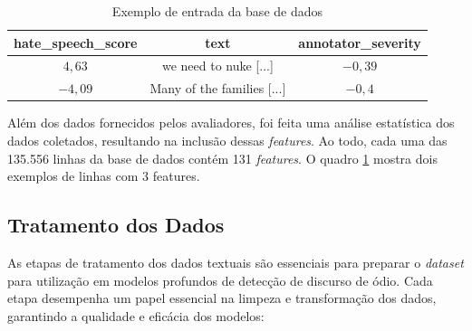 \documentclass[conference]{IEEEtran}
\begin{document}
\begin{table}[]
    \centering
    \caption{Exemplo de entrada da base de dados \cite{kennedy2020constructing}}
    \label{tab:dataset_example}
    \begin{tabular}{|c|c|c|}
        \hline
        \textbf{hate\_speech\_score} & \textbf{text} & \textbf{annotator\_severity} \\
        \hline
        $4,63$ & we need to nuke [...] & $-0,39$ \\\hline
        $-4,09$ & Many of the families [...] & $-0,4$ \\\hline
        
    \end{tabular}
    
\end{table}

Além dos dados fornecidos pelos avaliadores, foi feita uma análise estatística dos dados coletados, resultando na inclusão dessas \textit{features}. Ao todo, cada uma das 135.556 linhas da base de dados contém 131 \textit{features}. O quadro \ref{tab:dataset_example} mostra dois exemplos de linhas com 3 features.

\subsection{Tratamento dos Dados}

As etapas de tratamento dos dados textuais são essenciais para preparar o \textit{dataset} para utilização em modelos profundos de detecção de discurso de ódio. Cada etapa desempenha um papel essencial na limpeza e transformação dos dados, garantindo a qualidade e eficácia dos modelos:
\end{document}
